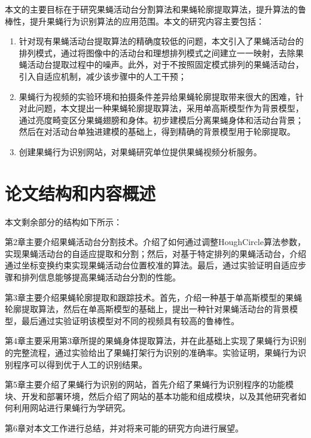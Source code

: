本文的主要目标在于研究果蝇活动台分割算法和果蝇轮廓提取算法，提升算法的鲁棒性，提升果蝇行为识别算法的应用范围。本文的研究内容主要包括：
\begin{enumerate}
\item 针对现有果蝇活动台提取算法的精确度较低的问题，本文引入了果蝇活动台的排列模式，通过将图像中的活动台和理想排列模式之间建立一一映射，去除果蝇活动台提取过程中的噪声。此外，对于不按照固定模式排列的果蝇活动台，引入自适应机制，减少该步骤中的人工干预；
\item 果蝇行为视频的实验环境和拍摄条件差异给果蝇轮廓提取带来很大的困难，针对此问题，本文提出一种果蝇轮廓提取算法，采用单高斯模型作为背景模型，通过亮度畸变区分果蝇翅膀和身体。初步建模后分离果蝇身体和活动台背景；然后在对活动台单独进建模的基础上，得到精确的背景模型用于轮廓提取。
\item 创建果蝇行为识别网站，对果蝇研究单位提供果蝇视频分析服务。
\end{enumerate}

\section{论文结构和内容概述}

本文剩余部分的结构如下所示：

第2章主要介绍果蝇活动台分割技术。介绍了如何通过调整HoughCircle算法参数，实现果蝇活动台的自适应提取和分割；然后，对基于特定排列的果蝇活动台，介绍通过坐标变换约束实现果蝇活动台位置校准的算法。最后，通过实验证明自适应步骤和排列信息能够提高果蝇活动台分割的性能。

第3章主要介绍果蝇轮廓提取和跟踪技术。首先，介绍一种基于单高斯模型的果蝇轮廓提取算法，然后在单高斯模型的基础上，提出一种针对果蝇活动台的背景模型，最后通过实验证明该模型对不同的视频具有较高的鲁棒性。

第4章主要采用第3章所提的果蝇身体提取算法，并在此基础上实现了果蝇行为识别的完整流程，通过实验给出了果蝇打架行为识别的准确率。实验证明，果蝇行为识别程序可以得到优于人工的识别结果。

第5章主要介绍了果蝇行为识别的网站，首先介绍了果蝇行为识别程序的功能模块、开发和部署环境，然后介绍了网站的基本功能和组成模块，以及其他研究者如何利用网站进行果蝇行为学研究。

第6章对本文工作进行总结，并对将来可能的研究方向进行展望。

